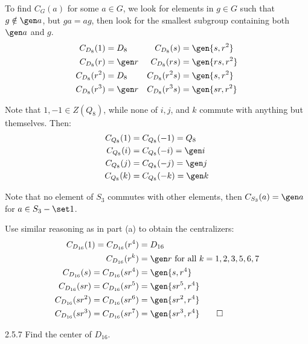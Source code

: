 \begin{solenum}
    \item To find $C_G(a)$ for some $a \in G$, we look for elements in $g \in G$ such that $g \notin \gen a$, but $ga = ag$, then look for the smallest subgroup containing both $\gen a$ and $g$.
    \begin{align*}
        C_{D_8}(1) & = D_8 & C_{D_8}(s) & = \gen{s, r^2} \\
        C_{D_8}(r) & = \gen r & C_{D_8}(rs) & = \gen{rs, r^2} \\
        C_{D_8}(r^2) & = D_8 & C_{D_8}(r^2s) & = \gen{s, r^2} \\
        C_{D_8}(r^3) & = \gen r & C_{D_8}(r^3s) & = \gen{sr, r^2}
    \end{align*}
    \item Note that $1, -1 \in Z(Q_8)$, while none of $i, j$, and $k$ commute with anything but themselves.
	Then:
    \begin{align*}
        C_{Q_8}(1) & = C_{Q_8}(-1) = Q_8 \\
        C_{Q_8}(i) & = C_{Q_8}(-i) = \gen i \\
        C_{Q_8}(j) & = C_{Q_8}(-j) = \gen j \\
        C_{Q_8}(k) & = C_{Q_8}(-k) = \gen k
    \end{align*}
    \item Note that no element of $S_3$ commutes with other elements, then $C_{S_3}(a) = \gen a$ for $a \in S_3 - \set 1$.
    \item Use similar reasoning as in part (a) to obtain the centralizers:
    \begin{align*}
        C_{D_{16}}(1) = C_{D_{16}}(r^4) & = D_{16} \\
        C_{D_{16}}(r^k) & = \gen r~\text{for all}~k = 1, 2, 3, 5, 6, 7 \\
        C_{D_{16}}(s) = C_{D_{16}}(sr^4) & = \gen{s, r^4} \\
        C_{D_{16}}(sr) = C_{D_{16}}(sr^5) & = \gen{sr^5, r^4} \\
        C_{D_{16}}(sr^2) = C_{D_{16}}(sr^6) & = \gen{sr^2, r^4} \\
        C_{D_{16}}(sr^3) = C_{D_{16}}(sr^7) & = \gen{sr^3, r^4} \qedhere
    \end{align*}
\end{solenum}

\begin{exercise}{2.5.7}
    Find the center of $D_{16}$.
\end{exercise}

